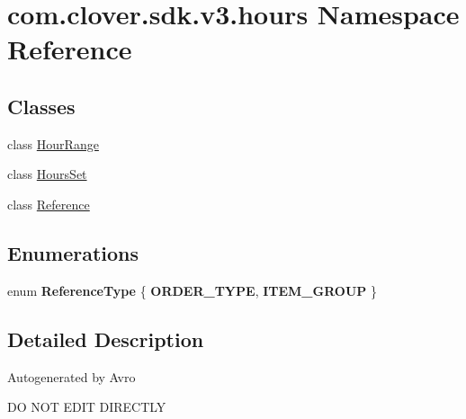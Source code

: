 \hypertarget{namespacecom_1_1clover_1_1sdk_1_1v3_1_1hours}{}\section{com.\+clover.\+sdk.\+v3.\+hours Namespace Reference}
\label{namespacecom_1_1clover_1_1sdk_1_1v3_1_1hours}
\subsection*{Classes}
\begin{DoxyCompactItemize}
\item 
class \hyperlink{classcom_1_1clover_1_1sdk_1_1v3_1_1hours_1_1_hour_range}{Hour\+Range}
\item 
class \hyperlink{classcom_1_1clover_1_1sdk_1_1v3_1_1hours_1_1_hours_set}{Hours\+Set}
\item 
class \hyperlink{classcom_1_1clover_1_1sdk_1_1v3_1_1hours_1_1_reference}{Reference}
\end{DoxyCompactItemize}
\subsection*{Enumerations}
\begin{DoxyCompactItemize}
\item 
\mbox{\label{namespacecom_1_1clover_1_1sdk_1_1v3_1_1hours_a8525667c21e8dadaefd0a149ff85b867}} 
enum {\bfseries Reference\+Type} \{ {\bfseries O\+R\+D\+E\+R\+\_\+\+T\+Y\+PE}, 
{\bfseries I\+T\+E\+M\+\_\+\+G\+R\+O\+UP}
 \}
\end{DoxyCompactItemize}


\subsection{Detailed Description}
Autogenerated by Avro

DO N\+OT E\+D\+IT D\+I\+R\+E\+C\+T\+LY 